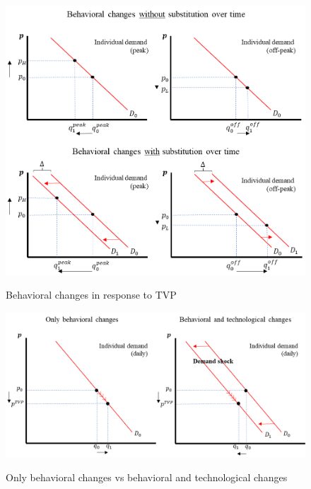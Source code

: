\clearpage


\begin{figure}[ht]
  \caption{Behavioral changes in response to TVP}\label{fig:four}
  \begin{center}
  {\includegraphics[width=1\textwidth]{./figures/image4.png}}
  \end{center}
\end{figure}

\clearpage


\begin{figure}[ht]
  \caption{Only behavioral changes vs behavioral and technological changes}\label{fig:five}
  \begin{center}
  {\includegraphics[width=1\textwidth]{./figures/image5.png}}
  \end{center}
\end{figure}

\clearpage
